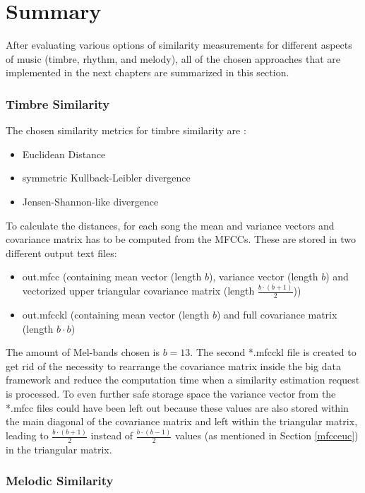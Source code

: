 \section{Summary}\label{sumfeat}

After evaluating various options of similarity measurements for different aspects of music (timbre, rhythm, and melody), all of the chosen approaches that are implemented in the next chapters are summarized in this section. 

\subsubsection{Timbre Similarity}

The chosen similarity metrics for timbre similarity are : 
\begin{itemize}
	\setlength\itemsep{-0.5em}
	\item Euclidean Distance
	\item symmetric Kullback-Leibler divergence
	\item Jensen-Shannon-like divergence
\end{itemize}
To calculate the distances, for each song the mean and variance vectors and covariance matrix has to be computed from the MFCCs. These are stored in two different output text files: 
\begin{itemize}
	\setlength\itemsep{-0.5em}
	\item out.mfcc (containing mean vector (length $b$), variance vector (length $b$) and vectorized upper triangular covariance matrix (length $\frac{b \cdot (b+1)}{2}$))
	\item out.mfcckl (containing mean vector (length $b$) and full covariance matrix (length $b \cdot b$)
\end{itemize}
The amount of Mel-bands chosen is $b = 13$. The second *.mfcckl file is created to get rid of the necessity to rearrange the covariance matrix inside the big data framework and reduce the computation time when a similarity estimation request is processed. To even further safe storage space the variance vector from the *.mfcc files could have been left out because these values are also stored within the main diagonal of the covariance matrix and left within the triangular matrix, leading to $\frac{b \cdot (b+1)}{2}$ instead of $\frac{b \cdot (b-1)}{2}$ values (as mentioned in Section \ref{mfcceuc}) in the triangular matrix.\\

\subsubsection{Melodic Similarity}

